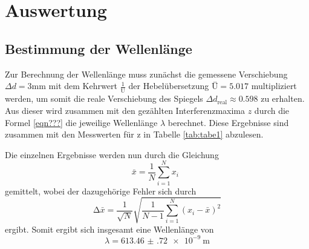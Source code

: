 \section{Auswertung}
\label{sec:Auswertung}
\subsection{Bestimmung der Wellenlänge}
Zur Berechnung der Wellenlänge muss zunächst die gemessene Verschiebung
$\Delta d = 3 \si{\milli\meter}$
mit dem Kehrwert $\frac{1}{\text{Ü}}$ der Hebelübersetzung $\text{Ü}=5.017$ multipliziert werden,
um somit die reale Verschiebung des Spiegels $\Delta d_{\text{real}} \approx 0.598$ zu erhalten.
Aus dieser wird zusammen mit den gezählten Interferenzmaxima $z$ durch die Formel
\ref{eqn???} die jeweilige Wellenlänge $\lambda$ berechnet. Diese Ergebnisse sind
zusammen mit den Messwerten für z in Tabelle \ref{tab:tabe1} abzulesen.

Die einzelnen Ergebnisse werden nun durch die Gleichung
\begin{equation}
  \bar{x} = \frac{1}{N} \sum_{i=1}^{N} x_i \: \:
  \label{eqn:mit}
\end{equation}
\noindent gemittelt, wobei der dazugehörige Fehler sich durch
\begin{equation}
  \increment \bar{x} = \frac{1}{\sqrt{N}} \sqrt{ \frac{1}{N-1} \sum_{i=1}^N
  (x_i - \bar{x})^2}
  \label{eqn:mitf}
\end{equation}
ergibt.
Somit ergibt sich insgesamt eine Wellenlänge von
\begin{equation*}
  \lambda= \SI{613.46(72)e-9}{\meter}
\end{equation*}
